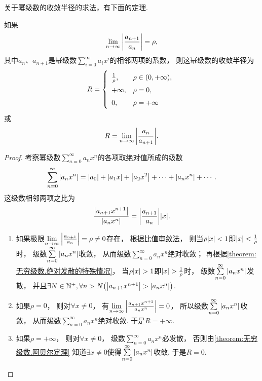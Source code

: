 关于幂级数的收敛半径的求法，有下面的定理.
\begin{theorem}\label{theorem:无穷级数.幂级数的收敛半径的求法}
如果\[
\lim\limits_{n\to\infty} \abs{\frac{a_{n+1}}{a_n}} = \rho,
\]其中\(a_n\)、\(a_{n+1}\)是幂级数\(\sum\limits_{i=0}^\infty {a_i x^i}\)的相邻两项的系数，%
则这幂级数的收敛半径为\[
\def\arraystretch{1.5}
R = \left\{ \begin{array}{ll}
\frac{1}{\rho}, & \rho \in (0,+\infty), \\
+\infty, & \rho = 0, \\
0, & \rho = +\infty \\
\end{array} \right.
\]或\[
R = \lim\limits_{n\to\infty} {\abs{\frac{a_n}{a_{n+1}}}}.
\]
\begin{proof}
\def\s{\sum\limits_{n=0}^\infty }%
考察幂级数\(\s a_n x^n\)的各项取绝对值所成的级数\[
\s \abs{a_n x^n}
= \abs{a_0} + \abs{a_1 x} + \abs{a_2 x^2} + \dotsb + \abs{a_n x^n} + \dotsb.
\]
这级数相邻两项之比为\[
\frac{\abs{a_{n+1} x^{n+1}}}{\abs{a_n x^n}}
= \abs{\frac{a_{n+1}}{a_n}} \abs{x}.
\]

\begin{enumerate}
	\item 如果极限\(\lim\limits_{n\to\infty} \abs{\frac{a_{n+1}}{a_n}} = \rho\neq0\)存在，%
根据\hyperref[theorem:无穷级数.正项级数的比值审敛法]{比值审敛法}，%
则当\(\rho \abs{x} < 1\)即\(\abs{x} < \frac{1}{\rho}\)时，%
级数\(\s \abs{a_n x^n}\)收敛，%
从而级数\(\s a_n x^n\)绝对收敛；
再根据\cref{theorem:无穷级数.绝对发散的特殊情况}，%
当\(\rho \abs{x} > 1\)即\(\abs{x} > \frac{1}{\rho}\)时，%
级数\(\s \abs{a_n x^n}\)发散，%
并且\(\exists N\in\mathbb{N}^+, \forall n > N \bigl(
	\abs{a_{n+1} x^{n+1}} > \abs{a_n x^n}
\bigr)\).
	\item 如果\(\rho=0\)，%
则对\(\forall x\neq0\)，%
有\(\lim\limits_{n\to\infty} \abs{\frac{a_{n+1} x^{n+1}}{a_n x^n}} = 0\)，%
所以级数\(\s \abs{a_n x^n}\)收敛，%
从而级数\(\s a_n x^n\)绝对收敛.%
于是\(R=+\infty\).
	\item 如果\(\rho=+\infty\)，%
则对\(\forall x\neq0\)，%
级数\(\s a_n x^n\)必发散，%
否则由\cref{theorem:无穷级数.阿贝尔定理} 知道\(\exists x\neq0\)使得\(\s \abs{a_n x^n}\)收敛.
于是\(R=0\).
\qedhere
\end{enumerate}
\end{proof}
\end{theorem}

